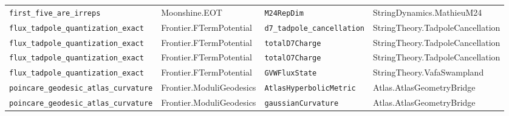 \begin{longtable}{p{}p{}p{}p{}}
\texttt{\small first\_five\_are\_irreps} & {\scriptsize Moonshine.EOT} & \texttt{\small M24RepDim} & {\scriptsize StringDynamics.MathieuM24} \\
\texttt{\small flux\_tadpole\_quantization\_exact} & {\scriptsize Frontier.FTermPotential} & \texttt{\small d7\_tadpole\_cancellation} & {\scriptsize StringTheory.TadpoleCancellation} \\
\texttt{\small flux\_tadpole\_quantization\_exact} & {\scriptsize Frontier.FTermPotential} & \texttt{\small totalD7Charge} & {\scriptsize StringTheory.TadpoleCancellation} \\
\texttt{\small flux\_tadpole\_quantization\_exact} & {\scriptsize Frontier.FTermPotential} & \texttt{\small totalO7Charge} & {\scriptsize StringTheory.TadpoleCancellation} \\
\texttt{\small flux\_tadpole\_quantization\_exact} & {\scriptsize Frontier.FTermPotential} & \texttt{\small GVWFluxState} & {\scriptsize StringTheory.VafaSwampland} \\
\texttt{\small poincare\_geodesic\_atlas\_curvature} & {\scriptsize Frontier.ModuliGeodesics} & \texttt{\small AtlasHyperbolicMetric} & {\scriptsize Atlas.AtlasGeometryBridge} \\
\texttt{\small poincare\_geodesic\_atlas\_curvature} & {\scriptsize Frontier.ModuliGeodesics} & \texttt{\small gaussianCurvature} & {\scriptsize Atlas.AtlasGeometryBridge} \\
\end{longtable}

